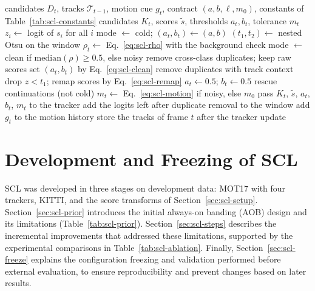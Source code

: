 \begin{algorithm}[tbp]
\caption{SCL for frame $t$; the comments name the steps of Fig.~\ref{fig:scl-arch}. The window holds the logits of frames $t-W$ to $t-1$, so the decision for frame $t$ uses no future frame.}\label{alg:scl-layer}
\begin{algorithmic}[1]
\Require candidates $D_t$, tracks $\mathcal{T}_{t-1}$, motion cue $g_t$, contract $(a,b,\ell,m_0)$, constants of Table~\ref{tab:scl-constants}
\Ensure candidates $K_t$, scores $\tilde{s}$, thresholds $a_t,b_t$, tolerance $m_t$
\State $z_i\gets$ logit of $s_i$ for all $i$ 
 
  \State mode $\gets$ cold; $(a_t,b_t)\gets(a,b)$
\Else
  \State $(t_1,t_2)\gets$ nested Otsu on the window 
  \State $\rho_t\gets$ Eq.~\eqref{eq:scl-rho} with the background check
  \State mode $\gets$ clean if $\mathrm{median}(\rho)\ge0.5$, else noisy 
\EndIf
{} 
  \State remove cross-class duplicates; keep raw scores
   set $(a_t,b_t)$ by Eq.~\eqref{eq:scl-clean}
  \EndIf
\Else {}
  \State remove duplicates with track context
  \State drop $z<t_1$; remap scores by Eq.~\eqref{eq:scl-remap}
  \State $a_t\gets0.5$; $b_t\gets0.5$
\EndIf
\State rescue continuations (not cold) 
\State $m_t\gets$ Eq.~\eqref{eq:scl-motion} if noisy, else $m_0$ 
\State pass $K_t$, $\tilde{s}$, $a_t$, $b_t$, $m_t$ to the tracker
\State add the logits left after duplicate removal to the window
\State add $g_t$ to the motion history
\State store the tracks of frame $t$ after the tracker update
\end{algorithmic}
\end{algorithm}

\section{Development and Freezing of SCL}\label{sec:scl-dev}
SCL was developed in three stages on development data: MOT17 with four trackers, KITTI, and the score transforms of Section~\ref{sec:scl-setup}. Section~\ref{sec:scl-prior} introduces the initial always-on banding (AOB) design and its limitations (Table~\ref{tab:scl-prior}). Section~\ref{sec:scl-steps} describes the incremental improvements that addressed these limitations, supported by the experimental comparisons in Table~\ref{tab:scl-ablation}. Finally, Section~\ref{sec:scl-freeze} explains the configuration freezing and validation performed before external evaluation, to ensure reproducibility and prevent changes based on later results.

